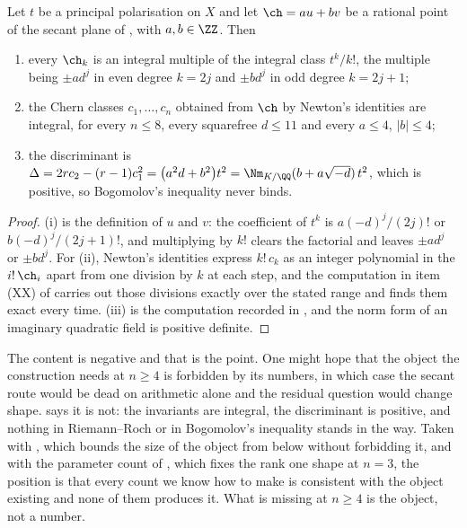 \begin{proposition}%
\label{prop:notforbidden}
Let $t$ be a principal polarisation on $X$ and let
$\ch=au+bv$ be a rational point of the secant plane of ,
with $a,b\in\ZZ$. Then
\begin{enumerate}[label=\textup{(\roman*)},nosep]
\item every $\ch_{k}$ is an integral multiple of the integral class
  $t^{k}/k!$, the multiple being $\pm a d^{j}$ in even degree $k=2j$ and
  $\pm b d^{j}$ in odd degree $k=2j+1$;
\item the Chern classes $c_{1},\dots,c_{n}$ obtained from $\ch$ by Newton's
  identities are integral, for every $n\le8$, every squarefree $d\le11$ and
  every $a\le4$, $|b|\le4$;
\item the discriminant is
  $\Delta=2rc_{2}-(r-1)c_{1}^{2}=\bigl(a^{2}d+b^{2}\bigr)t^{2}
  =\Nm_{K/\QQ}(b+a\sqrt{-d})\,t^{2}$, which is positive, so Bogomolov's
  inequality never binds.
\end{enumerate}
\end{proposition}

\begin{proof}
(i) is the definition of $u$ and $v$: the coefficient of $t^{k}$ is
$a(-d)^{j}/(2j)!$ or $b(-d)^{j}/(2j+1)!$, and multiplying by $k!$ clears the
factorial and leaves $\pm ad^{j}$ or $\pm bd^{j}$. For (ii), Newton's
identities express $k!\,c_{k}$ as an integer polynomial in the $i!\,\ch_{i}$
apart from one division by $k$ at each step, and the computation in item (XX)
of  carries out those divisions exactly over the stated
range and finds them exact every time. (iii) is the computation recorded in
, and the norm form of an imaginary quadratic field
is positive definite.
\end{proof}

\begin{remark}%
\label{rem:notforbidden}
The content is negative and that is the point. One might hope that the object
the construction needs at $n\ge4$ is forbidden by its numbers, in which case
the secant route would be dead on arithmetic alone and the residual question
would change shape.  says it is not: the invariants
are integral, the discriminant is positive, and nothing in Riemann--Roch or in
Bogomolov's inequality stands in the way. Taken with ,
which bounds the size of the object from below without forbidding it, and with
the parameter count of , which fixes the rank one shape
at $n=3$, the position is that every count we know how to
make is consistent with the object existing and none of them produces it. What
is missing at $n\ge4$ is the object, not a number.
\end{remark}

